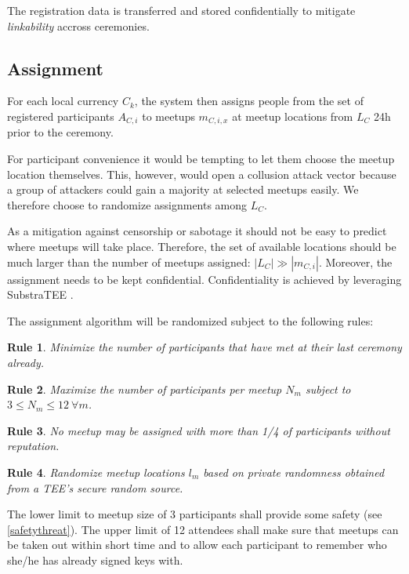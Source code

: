 \documentclass[conference]{IEEEtran}
\newtheorem{erule}{Rule}
\begin{document}
The registration data is transferred and stored confidentially to mitigate \emph{linkability} accross ceremonies.
\subsection{Assignment}

For each local currency $C_k$, the system then assigns people from the set of registered participants $A_{C,i}$ to meetups $m_{C,i,x}$ at meetup locations from $L_C$ 24h prior to the ceremony.

For participant convenience it would be tempting to let them choose the meetup location themselves. This, however, would open a collusion attack vector because a group of attackers could gain a majority at selected meetups easily. We therefore choose to randomize assignments among $L_C$.

As a mitigation against censorship or sabotage it should not be easy to predict where meetups will take place. Therefore, the set of available locations should be much larger than the number of meetups assigned: $|L_C| \gg |m_{C,i}|$. Moreover, the assignment needs to be kept confidential. Confidentiality is achieved by leveraging SubstraTEE \cite{substraTEE}.

The assignment algorithm will be randomized subject to the following rules: 

\begin{erule}\label{rule:notseeagain}
Minimize the number of participants that have met at their last ceremony already.
\end{erule}

\begin{erule}\label{rule:meetupsize}
Maximize the number of participants per meetup $N_m$ subject to $3 \leq N_m \leq 12\  \forall m$. 
\end{erule}

\begin{erule}\label{rule:noreplimit}
No meetup may be assigned with more than 1/4 of participants without reputation.
\end{erule}
	
\begin{erule}
Randomize meetup locations $l_m$ based on private randomness obtained from a TEE's secure random source.
\end{erule}

The lower limit to meetup size of 3 participants shall provide some safety (see \ref{safetythreat}). 
The upper limit of 12 attendees shall make sure that meetups can be taken out within short time and to allow each participant to remember who she/he has already signed keys with.
\end{document}
